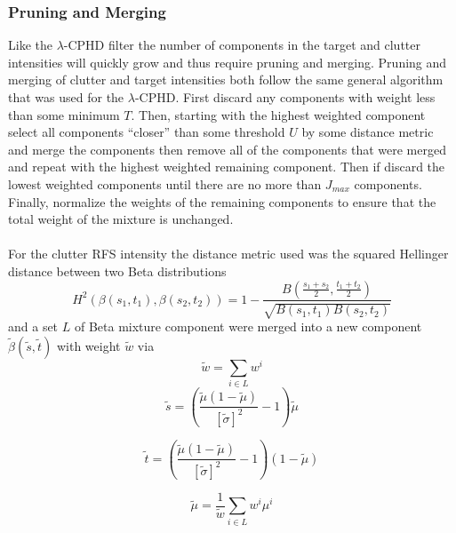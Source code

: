 \documentclass{article}
\begin{document}
\subsubsection*{Pruning and Merging}
Like the $\lambda$-CPHD filter the number of components in the target and clutter intensities will quickly grow and thus require pruning and merging. Pruning and merging of clutter and target intensities both follow the same general algorithm that was used for the $\lambda$-CPHD. First discard any components with weight less than some minimum $T$. Then, starting with the highest weighted component select all components ``closer'' than some threshold $U$ by some distance metric and merge the components then remove all of the components that were merged and repeat with the highest weighted remaining component. Then if discard the lowest weighted components until there are no more than $J_{max}$ components. Finally, normalize the weights of the remaining components to ensure that the total weight of the mixture is unchanged.\\
\\
For the clutter RFS intensity the distance metric used was the squared Hellinger distance between two Beta distributions
\begin{equation}
  \label{eq:hellinger_beta}
  H^2\left( \beta(s_1,t_1),\beta(s_2,t_2)\right) = 1 - \frac{B\left( \frac{s_1+s_2}{2},\frac{t_1+t_2}{2}\right)}{\sqrt{B(s_1,t_1)B(s_2,t_2)}}
\end{equation}
and a set $L$ of Beta mixture component were merged into a new component $\tilde{\beta}(\tilde{s},\tilde{t})$ with weight $\tilde{w}$ via
\begin{equation}
  \label{eq:beta_merge_w}
  \tilde{w} = \sum_{i \in L}w^i
\end{equation}
\begin{equation}
  \label{eq:beta_merge_s}
  \tilde{s} = \left( \frac{ \tilde{\mu} \left( 1 - \tilde{\mu} \right) }
    { \left[ \tilde{\sigma} \right]^2  } -1 \right)  \tilde{\mu}
\end{equation}

\begin{equation}
  \label{eq:beta_merge_t}
  \tilde{t} = \left( \frac{ \tilde{\mu} \left( 1 - \tilde{\mu} \right) }
    { \left[ \tilde{\sigma} \right]^2  } -1 \right)  \left( 1-\tilde{\mu} \right)
\end{equation}

\begin{equation}
  \label{eq:beta_mu_merge}
  \tilde{\mu} = \frac{ 1 }{\tilde{w}}\sum_{i \in L}w^i\mu^i
\end{equation}
\end{document}
